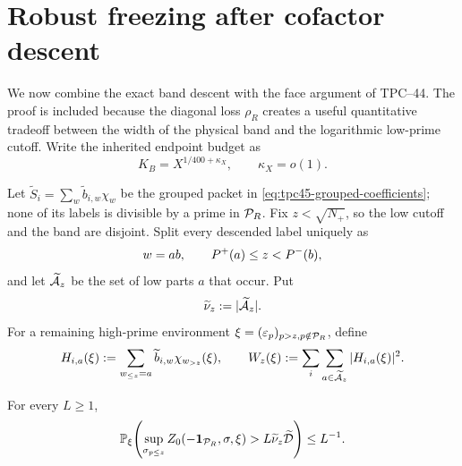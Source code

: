 \section{Robust freezing after cofactor descent}
\label{sec:tpc45-residual-freezing}

We now combine the exact band descent with the face argument of
TPC--44.  The proof is included because the diagonal loss
\(\rho_R\) creates a useful quantitative tradeoff between the width of
the physical band and the logarithmic low-prime cutoff.
Write the inherited endpoint budget as
\begin{equation}
 K_B=X^{1/400+\kappa_X},
 \qquad \kappa_X=o(1).
 \label{eq:tpc45-KB-definition}
\end{equation}

Let \(\widetilde S_i=\sum_w\widetilde b_{i,w}\chi_w\) be the grouped
packet in \eqref{eq:tpc45-grouped-coefficients}; none of its labels is
divisible by a prime in \(\mathcal P_R\).  Fix \(z<\sqrt{N_+}\), so the low
cutoff and the band are disjoint.  Split every descended label uniquely
as
\begin{equation}
 w=a b,
 \qquad P^{+}(a)\le z<P^{-}(b),
 \label{eq:tpc45-descended-low-high-split}
\end{equation}
and let \(\widetilde{\mathcal A}_z\) be the set of low parts \(a\) that occur.
Put
\begin{equation}
 \widetilde\nu_z:=|\widetilde{\mathcal A}_z|.
 \label{eq:tpc45-descended-projection-count}
\end{equation}
For a remaining high-prime environment \(\xi=(\varepsilon_p)_{p>z,
p\notin\mathcal P_R}\), define
\begin{equation}
 H_{i,a}(\xi)
 :=\sum_{w_{\le z}=a}
   \widetilde b_{i,w}\chi_{w_{>z}}(\xi),
 \qquad
 W_z(\xi):=\sum_i\sum_{a\in\widetilde{\mathcal A}_z}|H_{i,a}(\xi)|^2.
 \label{eq:tpc45-descended-Wz}
\end{equation}

\begin{lemma}
\label{lem:tpc45-robust-descended-face}
For every \(L\ge1\),
\begin{equation}
 \mathbb P_\xi\!\left(
  \sup_{\sigma_{p\le z}}
  Z_0(-\mathbf 1_{\mathcal P_R},\sigma,\xi)
  >L\widetilde\nu_z\widetilde{\mathcal D}
 \right)
 \le L^{-1}.
 \label{eq:tpc45-robust-descended-tail}
\end{equation}
\end{lemma}

